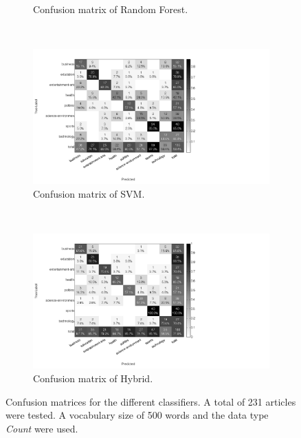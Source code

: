 \begin{figure}[H]
\begin{subfigure}[b]{\figwidth}
		\caption{Confusion matrix of Random Forest.}
		\label{fig:confmat-rf}
	\end{subfigure}
	~
	\begin{subfigure}[b]{\figwidth}
		\includegraphics[width=\textwidth,trim=0 0 350 0, clip]{img/SVM_percentile_5_count.png}
		\caption{Confusion matrix of SVM.}
		\label{fig:confmat-svm}
	\end{subfigure}
	\\
	\begin{subfigure}[b]{\figwidth}
		\includegraphics[width=\textwidth,trim=0 0 350 0, clip]{img/hybrid_percentile_5_count.png}
		\caption{Confusion matrix of Hybrid.}
		\label{fig:confmat-hybrid}
	\end{subfigure}
	\caption{Confusion matrices for the different classifiers. A total of 231 articles were tested. A vocabulary size of 500 words and the data type \emph{Count} were used.}
	\label{fig:hitrate}
\end{figure}
